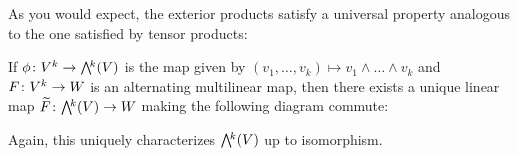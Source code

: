 As you would expect, the exterior products satisfy a universal property analogous to the one satisfied by tensor products:

\begin{theorem}\label{thm:exterior product universal property}
	If $\phi\from V^k \to \ext{k}(V)$ is the map given by $(v_1, \dots , v_k) \mapsto v_1 \wedge \dots \wedge v_k$ and $F \colon\thinspace\! V^k \to W$ is an alternating multilinear map, then there exists a unique linear map $\widetilde{F} \from \ext{k}(V) \to W$ making the following diagram commute:
	\begin{center}
	\end{center}
	Again, this uniquely characterizes $\ext{k}(V)$ up to isomorphism.
\end{theorem}

